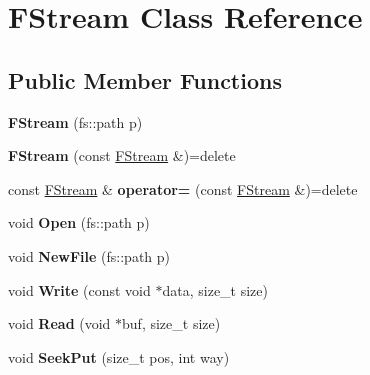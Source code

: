 \hypertarget{class_f_stream}{}\section{F\+Stream Class Reference}
\label{class_f_stream}
\subsection*{Public Member Functions}
\begin{DoxyCompactItemize}
\item 
\mbox{\label{class_f_stream_adfa884309b21af8b1636bb7f74a4617d}} 
{\bfseries F\+Stream} (fs\+::path p)
\item 
\mbox{\label{class_f_stream_a7e37c44e27e97d76864c58ceeeadfcc4}} 
{\bfseries F\+Stream} (const \mbox{\hyperlink{class_f_stream}{F\+Stream}} \&)=delete
\item 
\mbox{\label{class_f_stream_a1a37cedbb4bfef34b49e453d85191d6a}} 
const \mbox{\hyperlink{class_f_stream}{F\+Stream}} \& {\bfseries operator=} (const \mbox{\hyperlink{class_f_stream}{F\+Stream}} \&)=delete
\item 
\mbox{\label{class_f_stream_a0d1927c764f18a761f366036c195e72a}} 
void {\bfseries Open} (fs\+::path p)
\item 
\mbox{\label{class_f_stream_ae1b43a2451b2524a1118059e01b44578}} 
void {\bfseries New\+File} (fs\+::path p)
\item 
\mbox{\label{class_f_stream_a91aff51a6e4430ec6275496a84b623b7}} 
void {\bfseries Write} (const void $\ast$data, size\+\_\+t size)
\item 
\mbox{\label{class_f_stream_a97164a53ab8cf51c1f1a9927d70f991b}} 
void {\bfseries Read} (void $\ast$buf, size\+\_\+t size)
\item 
\mbox{\label{class_f_stream_aaf42506b1aa50ad5ae980330f9cb203b}} 
void {\bfseries Seek\+Put} (size\+\_\+t pos, int way)
\item 
\mbox{\label{class_f_stream_a37b75e7e7877d6f3161bde036624f5ce}} 

\end{DoxyCompactItemize}
